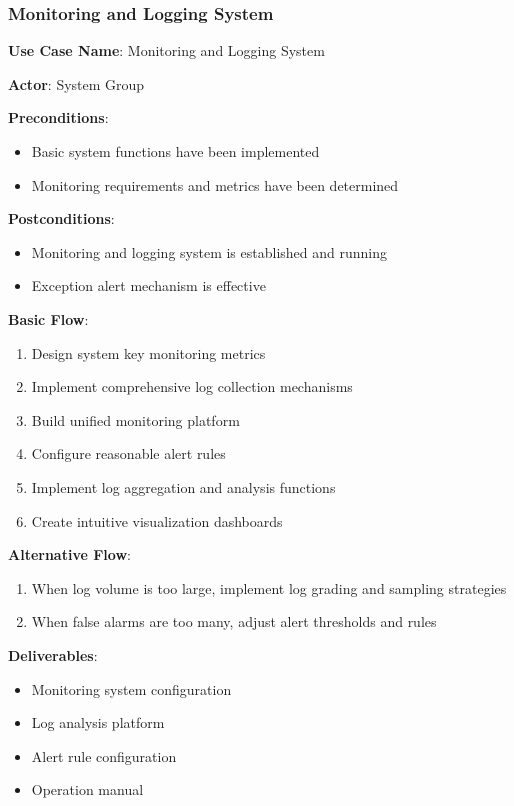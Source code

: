 \documentclass[a4paper,12pt]{article}
\begin{document}
\subsubsection{Monitoring and Logging System}

\textbf{Use Case Name}: Monitoring and Logging System

\textbf{Actor}: System Group

\textbf{Preconditions}:
\begin{itemize}
  \item Basic system functions have been implemented
  \item Monitoring requirements and metrics have been determined
\end{itemize}

\textbf{Postconditions}:
\begin{itemize}
  \item Monitoring and logging system is established and running
  \item Exception alert mechanism is effective
\end{itemize}

\textbf{Basic Flow}:
\begin{enumerate}
  \item Design system key monitoring metrics
  \item Implement comprehensive log collection mechanisms
  \item Build unified monitoring platform
  \item Configure reasonable alert rules
  \item Implement log aggregation and analysis functions
  \item Create intuitive visualization dashboards
\end{enumerate}

\textbf{Alternative Flow}:
\begin{enumerate}
  \item When log volume is too large, implement log grading and sampling strategies
  \item When false alarms are too many, adjust alert thresholds and rules
\end{enumerate}

\textbf{Deliverables}:
\begin{itemize}
  \item Monitoring system configuration
  \item Log analysis platform
  \item Alert rule configuration
  \item Operation manual
\end{itemize}
\end{document}
